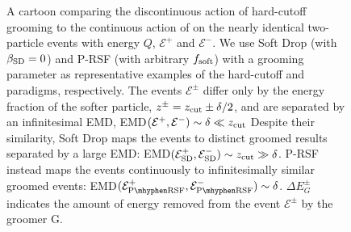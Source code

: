 \begin{figure}[]
{
}

\caption{
A cartoon comparing the discontinuous action of hard-cutoff grooming to the continuous action of \PIRANHA{} on the nearly identical two-particle events with energy \(Q\), \(\mathcal{E}^+\) and \(\mathcal{E}^-\).
%
We use Soft Drop (with \(\beta_{\rm SD} = 0\)) and P-RSF (with arbitrary \(f_{\rm soft}\)) with a grooming parameter \zcut{} as representative examples of the hard-cutoff and \PIRANHA{} paradigms, respectively.
The events \(\mathcal E^\pm\) differ only by the energy fraction of the softer particle,
%
\(
z^\pm = z_{\rm cut} \pm \delta/2
\),
%
and are separated by an infinitesimal EMD,
%
EMD\(
(\mathcal{E}^+, \mathcal{E}^-)
\sim \delta \ll z_{\rm cut}
\)
Despite their similarity, Soft Drop maps the events to distinct groomed results separated by a large EMD:
%
%
%
EMD\(
(\mathcal{E}_{\rm SD}^+, \mathcal{E}_{\rm SD}^-)
\sim z_{\rm cut} \gg \delta
\).
P-RSF instead
maps the events continuously to infinitesimally similar groomed events:
%
EMD\(
(\mathcal{E}_{\rm P\mhyphen RSF}^+,
\mathcal{E}_{\rm P\mhyphen RSF}^-)
\sim \delta
\).
%
\(\Delta E^\pm_G\) indicates the amount of energy removed from the event \(\mathcal E^\pm\) by the groomer G.
}
\label{fig:groomcartoon}
\end{figure}


